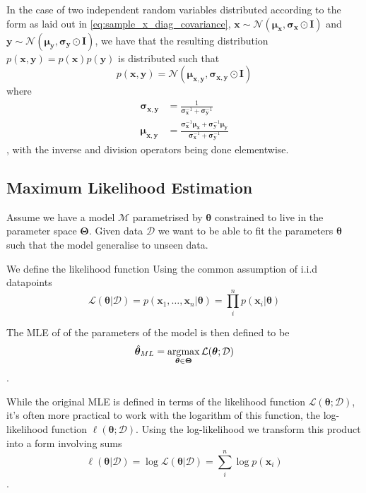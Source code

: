 In the case of two independent random variables distributed according to the form as laid
out in \eqref{eq:sample_x_diag_covariance}, $\bm{x} \sim
\mathcal{N}(\bm{\mu}_{\bm{x}}, \bm{\sigma}_{\bm{x}} \odot \bm{I})$
and $\bm{y} \sim \mathcal{N}(\bm{\mu}_{\bm{y}}, \bm{\sigma}_{\bm{y}}
\odot \bm{I})$, we have that the resulting distribution $p(\bm{x}, \bm{y}) =
p(\bm{x})p(\bm{y})$ is distributed such that
\begin{equation*}
  p(\bm{x}, \bm{y}) = \mathcal{N}(\bm{\mu}_{\bm{x}, \bm{y}}, \bm{\sigma}_{\bm{x}, \bm{y}} \odot \bm{I})
\end{equation*}
where
\begin{align}
  \bm{\sigma}_{\bm{x}, \bm{y}} & = \frac{1}{\bm{\sigma}_{\bm{x}}^{-1} + \bm{\sigma}_{\bm{y}}^{-1}} \label{eq:joint_indep_normal_covariance_diag}\\
  \bm{\mu}_{\bm{x}, \bm{y}} & = \frac{\bm{\sigma}_{\bm{x}}^{-1}\bm{\mu}_{\bm{x}} + \bm{\sigma}_{\bm{y}}^{-1}\bm{\mu}_{\bm{y}}}{\bm{\sigma}_{\bm{x}}^{-1} + \bm{\sigma}_{\bm{y}}^{-1}} \label{eq:joint_indep_normal_mean_diag}
\end{align},
with the inverse and division operators being done elementwise.

\subsection{Maximum Likelihood Estimation}

Assume we have a model $\mathcal{M}$ parametrised by $\bm{\theta}$ constrained
to live in the parameter space $\bm{\Theta}$. Given data $\mathcal{D}$ we want
to be able to fit the parameters $\bm{\theta}$ such that the model generalise to
unseen data.

We define the likelihood function Using the common assumption of i.i.d datapoints
\begin{equation}
  \label{eq:likelihood}
  \mathcal{L}(\bm{\theta} | \mathcal{D}) = p(\bm{x}_1, \dots, \bm{x}_n | \bm{\theta}) = \prod_i^n p(\bm{x}_i | \bm{\theta})
\end{equation}

The MLE of of the parameters of the model is then defined to be
\begin{equation}
  \label{eq:MLE}
  \hat{\bm{\theta}}_{ML} = \operatorname*{\arg\!\max}_{\bm{\theta} \in \bm{\Theta}}\mathcal{L}(\bm{\theta}; \mathcal{D})
\end{equation}
.

While the original MLE is defined in terms of the likelihood function
$\mathcal{L}(\bm{\theta}; \mathcal{D})$, it's often more practical to work with
the logarithm of this function, the log-likelihood function $\ell(\bm{\theta} ;
\mathcal{D})$. Using the log-likelihood we transform this product into a form involving sums
\begin{equation}
  \label{eq:loglikelihood}
  \ell(\bm{\theta} | \mathcal{D}) = \log \mathcal{L}(\bm{\theta} | \mathcal{D}) = \sum_i^n \log p(\bm{x}_i)
\end{equation}\cite{CaseBerg:01}.

